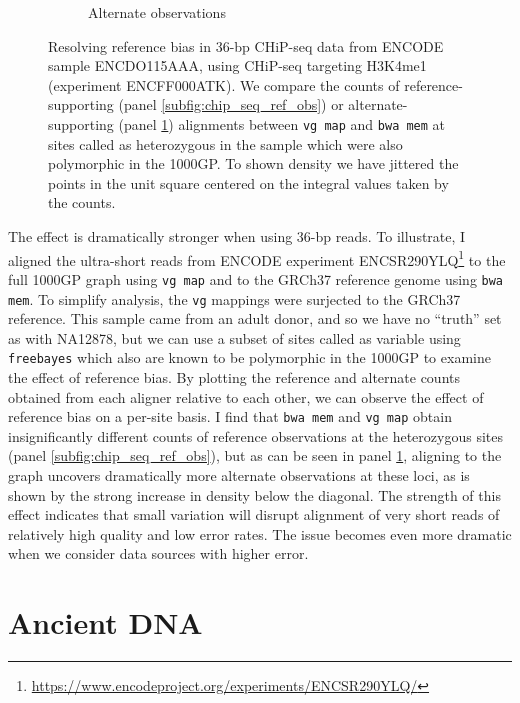 \documentclass[a4paper,12pt,numbered,oneside]{Classes/PhDThesisPSnPDF}
\begin{document}
\begin{figure}[htbp!]
\begin{subfigure}[t]{0.49\textwidth}
    \caption{Alternate observations}
    \label{subfig:chip_seq_alt_obs}
  \end{subfigure}
  \caption[Resolving reference bias in 36-bp CHiP-seq]{
    Resolving reference bias in 36-bp CHiP-seq data from ENCODE sample ENCDO115AAA, using CHiP-seq targeting H3K4me1 (experiment ENCFF000ATK).
    We compare the counts of reference-supporting (panel \ref{subfig:chip_seq_ref_obs}) or alternate-supporting (panel \ref{subfig:chip_seq_alt_obs}) alignments between {\tt vg map} and {\tt bwa mem} at sites called as heterozygous in the sample which were also polymorphic in the 1000GP.
    To shown density we have jittered the points in the unit square centered on the integral values taken by the counts.
   }
\label{fig:chip_seq}
\end{figure}

The effect is dramatically stronger when using 36-bp reads.
To illustrate, I aligned the ultra-short reads from ENCODE experiment ENCSR290YLQ\footnote{\url{https://www.encodeproject.org/experiments/ENCSR290YLQ/}} to the full 1000GP graph using {\tt vg map} and to the GRCh37 reference genome using {\tt bwa mem}.
To simplify analysis, the {\tt vg} mappings were surjected to the GRCh37 reference.
This sample came from an adult donor, and so we have no ``truth'' set as with NA12878, but we can use a subset of sites called as variable using {\tt freebayes} which also are known to be polymorphic in the 1000GP to examine the effect of reference bias.
By plotting the reference and alternate counts obtained from each aligner relative to each other, we can observe the effect of reference bias on a per-site basis.
I find that {\tt bwa mem} and {\tt vg map} obtain insignificantly different counts of reference observations at the heterozygous sites (panel \ref{subfig:chip_seq_ref_obs}), but as can be seen in panel \ref{subfig:chip_seq_alt_obs}, aligning to the graph uncovers dramatically more alternate observations at these loci, as is shown by the strong increase in density below the diagonal.
The strength of this effect indicates that small variation will disrupt alignment of very short reads of relatively high quality and low error rates.
The issue becomes even more dramatic when we consider data sources with higher error.

\section{Ancient DNA}
\end{document}
